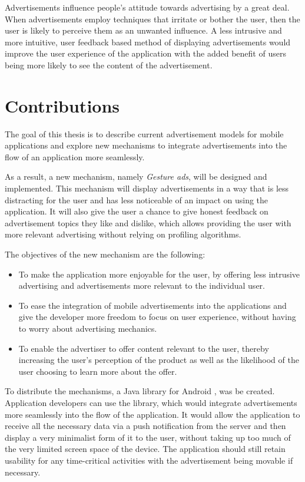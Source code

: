 Advertisements influence people's attitude towards advertising by a great deal. When advertisements employ techniques that irritate or bother the user, then the user is likely to perceive them as an unwanted influence.\cite{chowdhury2010consumer} A less intrusive and more intuitive, user feedback based method of displaying advertisements would improve the user experience of the application with the added benefit of users being more likely to see the content of the advertisement.

\section{Contributions}
The goal of this thesis is to describe current advertisement models for mobile applications and explore new mechanisms to integrate advertisements into the flow of an application more seamlessly.

As a result, a new mechanism, namely \textit{Gesture ads}, will be designed and implemented. This mechanism will display advertisements in a way that is less distracting for the user and has less noticeable of an impact on using the application. It will also give the user a chance to give honest feedback on advertisement topics they like and dislike, which allows providing the user with more relevant advertising without relying on profiling algorithms.

The objectives of the new mechanism are the following:
\begin{itemize}
  \item To make the application more enjoyable for the user, by offering less intrusive advertising and advertisements more relevant to the individual user.
  \item To ease the integration of mobile advertisements into the applications and give the developer more freedom to focus on user experience, without having to worry about advertising mechanics.
  \item To enable the advertiser to offer content relevant to the user, thereby increasing the user's perception of the product as well as the likelihood of the user choosing to learn more about the offer.
\end{itemize}

To distribute the mechanisms, a Java library for Android \cite{android:platform}, was be created. Application developers can use the library, which would integrate advertisements more seamlessly into the flow of the application. It would allow the application to receive all the necessary data via a push notification from the server and then display a very minimalist form of it to the user, without taking up too much of the very limited screen space of the device. The application should still retain usability for any time-critical activities with the advertisement being movable if necessary.

